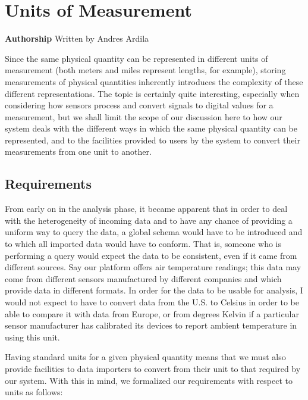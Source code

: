\section{Units of Measurement}\label{sec:units}

\textbf{Authorship} Written by Andres Ardila\\

\vspace*{4mm}

Since the same physical quantity can be represented in different units
of measurement (both meters and miles represent lengths, for example),
storing measurements of physical quantities inherently introduces the
complexity of these different representations. The topic is certainly
quite interesting, especially when considering how sensors process and
convert signals to digital values for a measurement, but we shall limit
the scope of our discussion here to how our system deals with the
different ways in which the same physical quantity can be represented,
and to the facilities provided to users by the system to convert their
measurements from one unit to another.

\subsection{Requirements}\label{requirements}

From early on in the analysis phase, it became apparent that in order to
deal with the heterogeneity of incoming data and to have any chance of
providing a uniform way to query the data, a global schema would have to
be introduced and to which all imported data would have to conform. That
is, someone who is performing a query would expect the data to be
consistent, even if it came from different sources. Say our platform
offers air temperature readings; this data may come from different
sensors manufactured by different companies and which provide data in
different formats. In order for the data to be usable for analysis, I
would not expect to have to convert data from the U.S. to Celsius in
order to be able to compare it with data from Europe, or from degrees
Kelvin if a particular sensor manufacturer has calibrated its devices to
report ambient temperature in using this unit.

Having standard units for a given physical quantity means that we must
also provide facilities to data importers to convert from their unit to
that required by our system. With this in mind, we formalized our
requirements with respect to units as follows:

